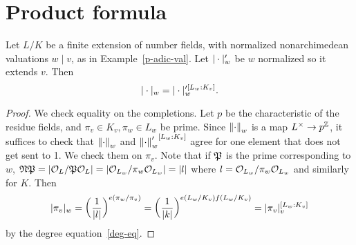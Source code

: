 \section{Product formula}
\begin{lem}
Let $L/K$ be a finite extension of number fields, with normalized nonarchimedean valuations $w\mid v$, as in Example~\ref{p-adic-val}. Let $|\cdot|_w'$ be $w$ normalized so it extends $v$. Then
\[
|\cdot|_w = |\cdot|_w'^{[L_w:K_v]}.
\]
\end{lem}
\begin{proof}
We check equality on the completions. Let $p$ be the characteristic of the residue fields, and $\pi_v\in K_v, \pi_w\in L_w$ be prime. 
Since $\left\Vert {\cdot}\right\Vert_w$ is a map $L^{\times}\to p^{\mathbb{Z}}$, it suffices to check that $\left\Vert {\cdot}\right\Vert_w$ and ${\left\Vert {\cdot}\right\Vert_w'}^{[L_w:K_v]}$ agree for one element that does not get sent to 1. We check them on $\pi_v$. 
Note that if $\mathfrak{P}$ is the prime corresponding to $w$, $\mathfrak{N} \mathfrak{P} = |\mathcal{O}_L/\mathfrak{P} \mathcal{O}_L| = |\mathcal{O}_{L_w}/\pi_w \mathcal{O}_{L_w}|=|l|$ where $l=\mathcal{O}_{L_w}/\pi_w\mathcal{O}_{L_w}$ and similarly for $K$. 
Then 
\[
|\pi_v|_w = \left( {\frac{1}{|l|}} \right)^{e(\pi_w/\pi_v)} = \left( {\frac{1}{|k|}} \right)^{e(L_w/K_v)f(L_w/K_v)} = |\pi_v|_v^{[L_w:K_v]}
\]
by the degree equation~\ref{deg-eq}. %
\end{proof}

